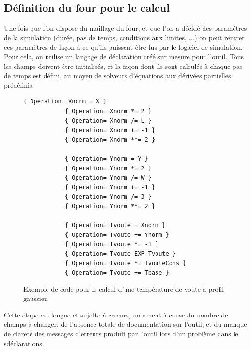 \documentclass[12pt, a4paper, french, BCOR = 0pt, DIV = 10]{scrartcl}
\begin{document}
    \subsection{Définition du four pour le calcul}
    Une fois que l'on dispose du maillage du four, et que l'on a décidé des paramètres de la simulation (durée, pas de temps, conditions aux limites, ...) on peut rentrer ces paramètres de façon à ce qu'ils puissent être lus par le logiciel de simulation. Pour cela, on utilise un langage de déclaration créé sur mesure pour l'outil. Tous les champs doivent être initialisés, et la façon dont ils sont calculés à chaque pas de temps est défini, au moyen de solveurs d'équations aux dérivées partielles prédéfinis.\\
    \begin{figure}[H]
        \caption{Exemple de code pour le calcul d'une température de voute à profil gaussien}
        \label{code.1}
        \begin{lstlisting}[frame=single]
            { Operation= Xnorm = X }
            { Operation= Xnorm *= 2 }
            { Operation= Xnorm /= L }
            { Operation= Xnorm += -1 }
            { Operation= Xnorm **= 2 }
          
            { Operation= Ynorm = Y }
            { Operation= Ynorm *= 2 }
            { Operation= Ynorm /= W }
            { Operation= Ynorm += -1 }
            { Operation= Ynorm /= 3 }
            { Operation= Ynorm **= 2 }
          
            { Operation= Tvoute = Xnorm }
            { Operation= Tvoute += Ynorm }
            { Operation= Tvoute *= -1 }
            { Operation= Tvoute EXP Tvoute }
            { Operation= Tvoute *= TvouteCons }
            { Operation= Tvoute += Tbase }
        \end{lstlisting}
    \end{figure}
    Cette étape est longue et sujette à erreurs, notament à cause du nombre de champs à changer, de l'absence totale de documentation sur l'outil, et du manque de clareté des messages d'erreurs produit par l'outil lors d'un problème dans le sdéclarations.
\end{document}
